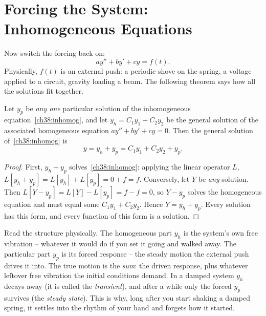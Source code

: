 \section{Forcing the System: Inhomogeneous Equations}
\label{ch38:forcing}

Now switch the forcing back on:
\begin{equation}
  a y'' + b y' + c y = f(t).
  \label{ch38:inhomog}
\end{equation}
Physically, $f(t)$ is an external push: a periodic shove on the spring, a voltage
applied to a circuit, gravity loading a beam. The following theorem says how all
the solutions fit together.

\begin{theorem}
\label{ch38:thm-structure}
Let $y_p$ be \emph{any one} particular solution of the inhomogeneous
equation~\eqref{ch38:inhomog}, and let $y_h = C_1 y_1 + C_2 y_2$ be the general
solution of the associated homogeneous equation $a y'' + b y' + c y = 0$. Then
the general solution of~\eqref{ch38:inhomog} is
\[
  y = y_h + y_p = C_1 y_1 + C_2 y_2 + y_p.
\]
\end{theorem}

\begin{proof}
First, $y_h + y_p$ solves~\eqref{ch38:inhomog}: applying the linear operator $L$,
$L[y_h + y_p] = L[y_h] + L[y_p] = 0 + f = f$. Conversely, let $Y$ be \emph{any}
solution. Then $L[Y - y_p] = L[Y] - L[y_p] = f - f = 0$, so $Y - y_p$ solves the
homogeneous equation and must equal some $C_1 y_1 + C_2 y_2$. Hence $Y = y_h +
y_p$. Every solution has this form, and every function of this form is a solution.
\end{proof}

\begin{intuitionbox}
Read the structure physically. The homogeneous part $y_h$ is the system's own
free vibration -- whatever it would do if you set it going and walked away. The
particular part $y_p$ is its forced response -- the steady motion the external
push drives it into. The true motion is the \emph{sum}: the driven response, plus
whatever leftover free vibration the initial conditions demand. In a damped
system $y_h$ decays away (it is called the \emph{transient}), and after a while
only the forced $y_p$ survives (the \emph{steady state}). This is why, long after
you start shaking a damped spring, it settles into the rhythm of your hand and
forgets how it started.
\end{intuitionbox}


